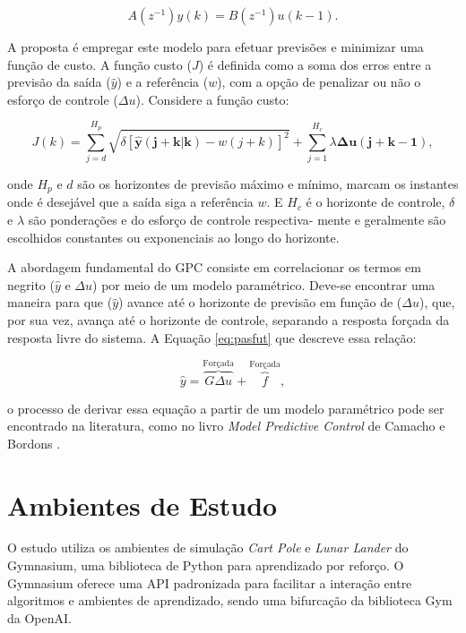 \documentclass[12pt,           %
a4paper,                       %
openany,                       %
oneside,                       %
chapter=TITLE,                 %
english,                       %
spanish,                       %
brazil,                        %
sumario=tradicional]{abntex2}  %
\begin{document}
\begin{OnehalfSpace}
\begin{equation}%
     \label{eq:arx0}
        A(z^{-1}) y(k) =  B(z^{-1}) u(k-1).
\end{equation}

A proposta é empregar este modelo  para efetuar previsões e minimizar uma função de custo. A função custo ($J$) é definida como a soma dos erros entre a previsão da saída ($\hat{y}$) e a referência ($w$), com a opção de penalizar ou não o esforço de controle ($\Delta u$). Considere a função custo:

\begin{equation}
    \label{eq:custo}
    J(k) = \sum_{j=d}^{H_p} \sqrt{\delta[\boldsymbol{\hat{y}(j+k|k)} - w(j+k)]^2} +  \sum_{j=1}^{H_c} \lambda \boldsymbol{\Delta u(j+k-1)},
\end{equation}

\noindent onde $H_p$ e $d$ são os horizontes de previsão máximo e mínimo, marcam os instantes onde é desejável que a saída siga a referência $w$. E $H_c$ é o horizonte de controle, $\delta$ e $\lambda$ são ponderações e do esforço de controle respectiva- mente e geralmente são escolhidos constantes ou exponenciais ao longo do horizonte.

A abordagem fundamental do GPC consiste em correlacionar os termos em negrito ($\hat{y}$ e $\Delta u$) por meio de um modelo paramétrico. Deve-se encontrar uma maneira para que ($\hat{y}$) avance até o horizonte de previsão em função de ($\Delta u$), que, por sua vez, avança até o horizonte de controle, separando a resposta forçada da resposta livre do sistema. A Equação \ref{eq:pasfut} que descreve essa relação:

\begin{equation}
	\label{eq:pasfut}
	\hat{y} = \overbrace{G\Delta u}^{\text{Forçada}} + \overbrace{f}^{\text{Forçada}},
\end{equation}

\noindent o processo de derivar essa equação a partir de um modelo paramétrico pode ser encontrado na literatura, como no livro \textit{Model Predictive Control} de Camacho e Bordons  \cite{camacho2004}.

\section{Ambientes de Estudo}
\label{sec:AE}

O estudo utiliza os ambientes de simulação \textit{Cart Pole} e \textit{Lunar Lander} do Gymnasium, uma biblioteca de Python para aprendizado por reforço. O Gymnasium oferece uma API padronizada para facilitar a interação entre algoritmos e ambientes de aprendizado, sendo uma bifurcação da biblioteca Gym da OpenAI.


\end{OnehalfSpace}
\end{document}
